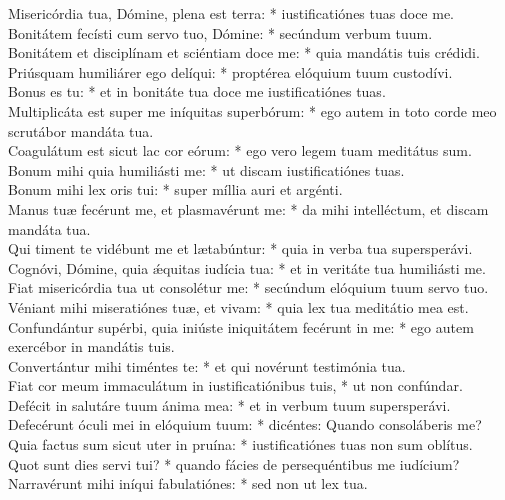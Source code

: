 {	Misericórdia tua, Dómine, plena est terra: * iustificatiónes tuas doce me. \\
	Bonitátem fecísti cum servo tuo, Dómine: * secúndum verbum tuum. \\
	Bonitátem et disciplínam et sciéntiam doce me: * quia mandátis tuis crédidi. \\
	Priúsquam humiliárer ego delíqui: * proptérea elóquium tuum custodívi. \\
	Bonus es tu: * et in bonitáte tua doce me iustificatiónes tuas. \\
	Multiplicáta est super me iníquitas superbórum: * ego autem in toto corde meo scrutábor mandáta tua. \\
	Coagulátum est sicut lac cor eórum: * ego vero legem tuam meditátus sum. \\
	Bonum mihi quia humiliásti me: * ut discam iustificatiónes tuas. \\
	Bonum mihi lex oris tui: * super míllia auri et argénti. \\
	Manus tuæ fecérunt me, et plasmavérunt me: * da mihi intelléctum, et discam mandáta tua. \\
	Qui timent te vidébunt me et lætabúntur: * quia in verba tua supersperávi. \\
	Cognóvi, Dómine, quia ǽquitas iudícia tua: * et in veritáte tua humiliásti me. \\
	Fiat misericórdia tua ut consolétur me: * secúndum elóquium tuum servo tuo. \\
	Véniant mihi miseratiónes tuæ, et vivam: * quia lex tua meditátio mea est. \\
	Confundántur supérbi, quia iniúste iniquitátem fecérunt in me: * ego autem exercébor in mandátis tuis. \\
	Convertántur mihi timéntes te: * et qui novérunt testimónia tua. \\
	Fiat cor meum immaculátum in iustificatiónibus tuis, * ut non confúndar. \\
	Defécit in salutáre tuum ánima mea: * et in verbum tuum supersperávi. \\
	Defecérunt óculi mei in elóquium tuum: * dicéntes: Quando consoláberis me? \\
	Quia factus sum sicut uter in pruína: * iustificatiónes tuas non sum oblítus. \\
	Quot sunt dies servi tui? * quando fácies de persequéntibus me iudícium? \\
	Narravérunt mihi iníqui fabulatiónes: * sed non ut lex tua. \\
}
